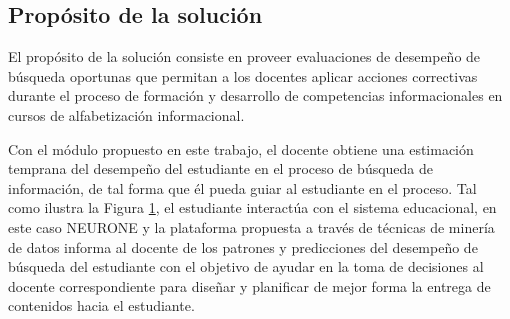 \subsection{Propósito de la solución}
\label{subsec:proposito-solucion}
El propósito de la solución consiste en proveer evaluaciones de desempeño de búsqueda oportunas que permitan a los docentes aplicar acciones correctivas durante el proceso de formación y desarrollo de competencias informacionales en cursos de alfabetización informacional.

Con el módulo propuesto en este trabajo, el docente obtiene una estimación temprana del desempeño del estudiante en el proceso de búsqueda de información, de tal forma que él pueda guiar al estudiante en el proceso. Tal como ilustra la Figura \ref{fig:docente_estudiante}, el estudiante interactúa con el sistema educacional, en este caso NEURONE y la plataforma propuesta a través de técnicas de minería de datos informa al docente de los patrones y predicciones del desempeño de búsqueda del estudiante con el objetivo de ayudar en la toma de decisiones al docente correspondiente para diseñar y planificar de mejor forma la entrega de contenidos hacia el estudiante.

\begin{figure}[H]
	\centering
	
	\label{fig:docente_estudiante}
\end{figure}
